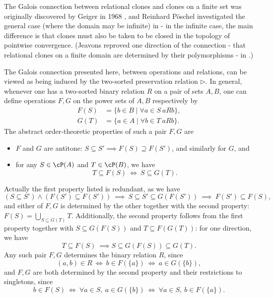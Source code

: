 \begin{rem} The Galois connection between relational clones and clones on a finite set was originally discovered by Geiger in 1968 \cite{geiger-galois}, and Reinhard P\"oschel investigated the general case (where the domain may be infinite) in \cite{poschel-galois} - in the infinite case, the main difference is that clones must also be taken to be closed in the topology of pointwise convergence. (Jeavons reproved one direction of the connection - that relational clones on a finite domain are determined by their polymorphisms - in \cite{jeavons}.)
\end{rem}

\begin{rem} The Galois connection presented here, between operations and relations, can be viewed as being induced by the two-sorted preservation relation $\rhd$. In general, whenever one has a two-sorted binary relation $R$ on a pair of sets $A, B$, one can define operations $F,G$ on the power sets of $A, B$ respectively by
\begin{align*}
F(S) &= \{b \in B \mid \forall a \in S\ aRb\},\\
G(T) &= \{a \in A \mid \forall b \in T\ aRb\}.
\end{align*}
The abstract order-theoretic properties of such a pair $F,G$ are
\begin{itemize}
\item $F$ and $G$ are antitone: $S \subseteq S' \implies F(S) \supseteq F(S')$, and similarly for $G$, and

\item for any $S \in \cP(A)$ and $T \in \cP(B)$, we have
\[
T \subseteq F(S)\ \iff\ S \subseteq G(T).
\]
\end{itemize}
Actually the first property listed is redundant, as we have
\[
(S\subseteq S') \wedge (F(S') \subseteq F(S'))\ \implies\ S \subseteq S' \subseteq G(F(S'))\ \implies\ F(S') \subseteq F(S),
\]
and either of $F,G$ is determined by the other together with the second property: $F(S) = \bigcup_{S \subseteq G(T)} T$. Additionally, the second property follows from the first property together with $S \subseteq G(F(S))$ and $T \subseteq F(G(T))$: for one direction, we have
\[
T \subseteq F(S)\ \implies S \subseteq G(F(S)) \subseteq G(T).
\]
Any such pair $F,G$ determines the binary relation $R$, since
\[
(a,b) \in R\ \iff\ b \in F(\{a\})\ \iff\ a \in G(\{b\}),
\]
and $F,G$ are both determined by the second property and their restrictions to singletons, since
\[
b \in F(S)\ \iff\ \forall a \in S,\ a \in G(\{b\})\ \iff\ \forall a \in S,\ b \in F(\{a\}).
\]


\end{rem}
